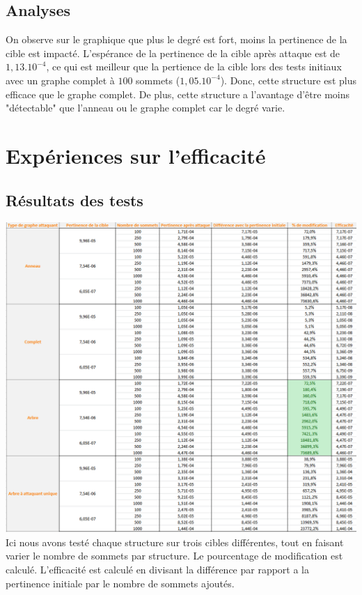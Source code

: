 \documentclass[a4paper,11pt]{article}
\begin{document}
	\subsection{Analyses}
		On observe sur le graphique que plus le degré est fort, moins la pertinence de la cible est impacté. L'espérance de la pertinence de la cible après attaque est de $1,13.10^{-4}$, ce qui est meilleur que la pertience de la cible lors des tests initiaux avec un graphe complet à $100$ sommets ($1,05.10^{-4}$). Donc, cette structure est plus efficace que le graphe complet. De plus, cette structure a l'avantage d'être moins "détectable" que l'anneau ou le graphe complet car le degré varie.
	
	
\section{Expériences sur l'efficacité}
	
	\subsection{Résultats des tests}
		\includegraphics[scale = 0.5]{Captures/ranking5.PNG}\\
		Ici nous avons testé chaque structure sur trois cibles différentes, tout en faisant varier le nombre de sommets par structure. 
		Le pourcentage de modification est calculé. L'efficacité est calculé en divisant la différence par rapport a la pertinence initiale par le nombre de sommets ajoutés.\\
\end{document}
